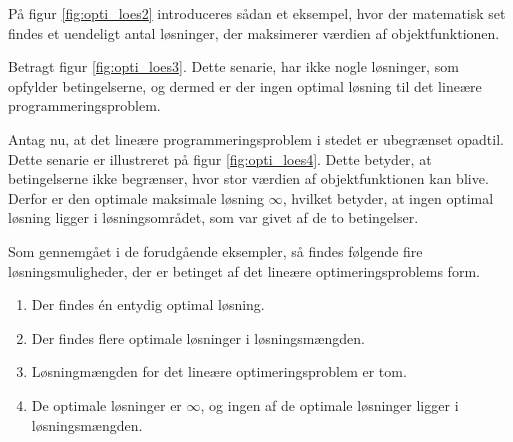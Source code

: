 På figur \ref{fig:opti_loes2} introduceres sådan et eksempel, hvor der matematisk set findes et uendeligt antal løsninger, der
maksimerer værdien af objektfunktionen. 
%

%
\noindent
%
Betragt figur \ref{fig:opti_loes3}.
Dette senarie, har ikke nogle løsninger, som opfylder betingelserne, og dermed er der ingen optimal løsning til det lineære programmeringsproblem. 
%

%
\noindent
%
Antag nu, at det lineære programmeringsproblem i stedet er ubegrænset opadtil.
Dette senarie er illustreret på figur \ref{fig:opti_loes4}.
%
Dette betyder, at betingelserne ikke begrænser, hvor stor
værdien af objektfunktionen kan blive. 
Derfor er den optimale maksimale løsning $\infty$, hvilket betyder, at ingen optimal løsning ligger i løsningsområdet, som var givet af de to betingelser. 
%

%
\noindent
%
Som gennemgået i de forudgående eksempler, så findes følgende fire løsningsmuligheder, der er betinget af det lineære optimeringsproblems form.
%
\begin{enumerate}
\item Der findes én entydig optimal løsning.
\item Der findes flere optimale løsninger i løsningsmængden.
\item Løsningmængden for det lineære optimeringsproblem er tom. 
\item De optimale løsninger er $\infty$, og ingen af de optimale løsninger ligger i løsningsmængden.
\end{enumerate}
%